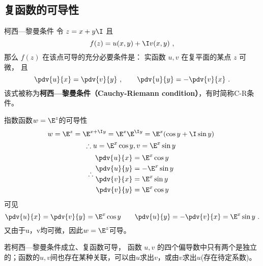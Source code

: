 \subsection{复函数的可导性}\label{sub_CauRie_1}

\begin{theorem}{柯西—黎曼条件}
令 $z = x + y\I$ 且
\begin{equation}
f(z) = u(x, y) + \I v(x, y)~,
\end{equation}
那么 $f(z)$ 在该点可导的充分必要条件是： 实函数 $u,v$ 在复平面的某点 $z$ 可微， 且
\begin{equation}\label{eq_CauRie_1}
\pdv{u}{x} = \pdv{v}{y}~, \qquad
\pdv{u}{y} = - \pdv{v}{x}~.
\end{equation}
该式被称为\textbf{柯西—黎曼条件（Cauchy-Riemann condition）}，有时简称C-R条件。
\end{theorem}

\begin{example}{指数函数$w=\E^z$的可导性}
$$w = \E^z = \E^{x + \I y} = \E^x \E^{\I y}=\E^x(\cos y + \I\sin y)~
$$
$$\therefore u=\E^x\cos y, v = \E^x\sin y~
$$
$$
\therefore
\begin{aligned}
\pdv{u}{x} &= \E^x\cos y\\
\pdv{u}{y} &= -\E^x\sin y\\
\pdv{v}{x} &= \E^x\sin y\\
\pdv{v}{y} &= \E^x\cos y\\
\end{aligned}~
$$
可见
\begin{equation}
\pdv{u}{x} = \pdv{v}{y}= \E^x\cos y \qquad
\pdv{u}{y} = - \pdv{v}{x}= \E^x\sin y~.
\end{equation}
又由于u，v均可微，因此$w=\E^z$可导。
\end{example}

若柯西—黎曼条件成立、复函数可导， 函数 $u,v$ 的四个偏导数中只有两个是独立的；函数的$u,v$间也存在某种关联，可以由$u$求出$v$，或由$v$求出$u$(存在待定系数)。

